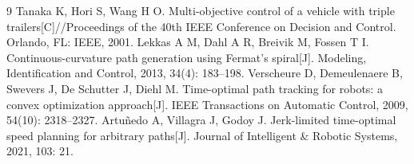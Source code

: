 ﻿\documentclass{cumcmthesis}
\begin{document}
\begin{thebibliography}{9}
 Tanaka K, Hori S, Wang H O. Multi-objective control of a vehicle with triple trailers[C]//Proceedings of the 40th IEEE Conference on Decision and Control. Orlando, FL: IEEE, 2001.
 Lekkas A M, Dahl A R, Breivik M, Fossen T I. Continuous-curvature path generation using Fermat's spiral[J]. Modeling, Identification and Control, 2013, 34(4): 183--198.
 Verscheure D, Demeulenaere B, Swevers J, De Schutter J, Diehl M. Time-optimal path tracking for robots: a convex optimization approach[J]. IEEE Transactions on Automatic Control, 2009, 54(10): 2318--2327.
 Artuñedo A, Villagra J, Godoy J. Jerk-limited time-optimal speed planning for arbitrary paths[J]. Journal of Intelligent \& Robotic Systems, 2021, 103: 21.
\end{thebibliography}
\end{document}

